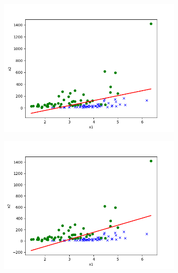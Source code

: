 \begin{answer}
    \begin{figure}[htbp]
        \begin{subfigure}[b]{0.5\linewidth}
            \centering
            \includegraphics[width=\linewidth]{../src/output/p01b_pred_1.png}
        \end{subfigure}
        \begin{subfigure}[b]{0.5\linewidth}
            \centering
            \includegraphics[width=\linewidth]{../src/output/p01e_pred_1.png}
        \end{subfigure}
    \end{figure}
\end{answer}
